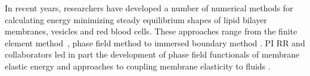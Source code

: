In recent years, researchers have developed a number of numerical methods for calculating
energy minimizing steady equilibrium shapes of lipid bilayer membranes, vesicles and red blood cells.
These approaches range from the finite element method~\cite{Bartels,Peng13,RyKlYaCo16,Sinha15}, 
phase field method \cite{Du05,QiangDu08,Lowengrub13} to immersed
boundary method  \cite{Hu,Hu13, KimLai2010_JCP}.
PI RR and collaborators led in part the development of phase field
functionals of membrane elastic energy and approaches to coupling membrane elasticity to fluids  \cite{0951-7715-18-3-016,Du05,DuEuler,QiangDu09}.

